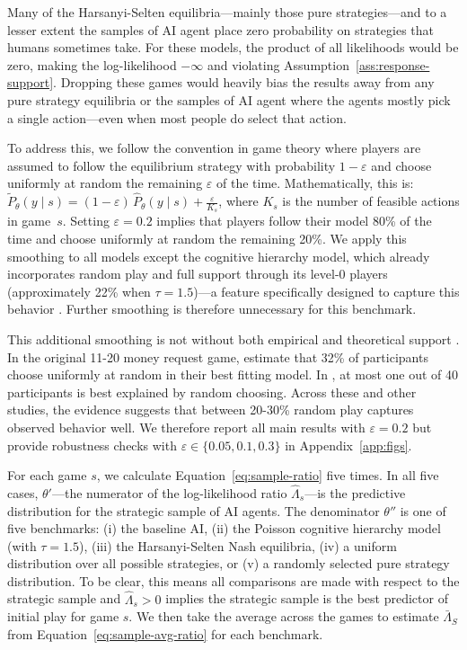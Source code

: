 \documentclass[11pt]{article}
\theoremstyle{definition}
\newcommand{\aisub}{AI agent}
\begin{document}
Many of the Harsanyi-Selten equilibria---mainly those pure strategies---and to a lesser extent the samples of \aisub{} place zero probability on strategies that humans sometimes take.
For these models, the product of all likelihoods would be zero, making the log-likelihood $-\infty$ and violating Assumption~\ref{ass:response-support}.
Dropping these games would heavily bias the results away from any pure strategy equilibria or the samples of \aisub{} where the agents mostly pick a single action---even when most people do select that action. 

To address this, we follow the convention in game theory where players are assumed to follow the equilibrium strategy with probability $1-\varepsilon$ and choose uniformly at random the remaining $\varepsilon$ of the time.
Mathematically, this is: $\tilde P_{\theta}(y\mid s) = (1-\varepsilon)\,\hat P_{\theta}(y\mid s) + \frac{\varepsilon}{K_{s}}$, where $K_{s}$ is the number of feasible actions in game~$s$.
Setting $\varepsilon=0.2$ implies that players follow their model 80\% of the time and choose uniformly at random the remaining 20\%.
We apply this smoothing to all models except the cognitive hierarchy model, which already incorporates random play and full support through its level-0 players (approximately 22\% when $\tau = 1.5$)---a feature specifically designed to capture this behavior \citep{Camerer2004Cognitive}.
Further smoothing is therefore unnecessary for this benchmark.

This additional smoothing is not without both empirical and theoretical support \citep{mckelvey1992experimental,mckelvey1995quantal}.
In the original 11-20 money request game, \citeauthor{1120Arad2012} estimate that 32\% of participants choose uniformly at random in their best fitting model.
In \citeauthor{STAHL1994}, at most one out of 40 participants is best explained by random choosing.
Across these and other studies, the evidence suggests that between 20-30\% random play captures observed behavior well.
We therefore report all main results with $\varepsilon = 0.2$ but provide robustness checks with $\varepsilon \in \{0.05, 0.1, 0.3\}$ in Appendix~\ref{app:figs}.

For each game $s$, we calculate Equation~\ref{eq:sample-ratio} five times.
In all five cases, $\theta'$---the numerator of the log-likelihood ratio $\hat \Lambda_s$---is the predictive distribution for the strategic sample of \aisub{s}.
The denominator $\theta''$ is one of five benchmarks: (i) the baseline AI, (ii) the Poisson cognitive hierarchy model (with $\tau = 1.5$), (iii) the Harsanyi-Selten Nash equilibria, (iv) a uniform distribution over all possible strategies, or (v) a randomly selected pure strategy distribution.
To be clear, this means all comparisons are made with respect to the strategic sample and $\hat \Lambda_s > 0$ implies the strategic sample is the best predictor of initial play for game $s$.
We then take the average across the games to estimate $\bar \Lambda_S$ from Equation~\ref{eq:sample-avg-ratio} for each benchmark.
\end{document}
